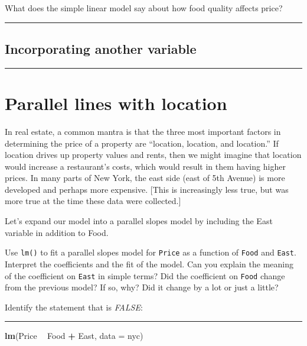 \documentclass[
]{book}
\newenvironment{Shaded}{\begin{snugshade}}{\end{snugshade}}
\newcommand{\DataTypeTok}[1]{\textcolor[rgb]{0.13,0.29,0.53}{#1}}
\newcommand{\KeywordTok}[1]{\textcolor[rgb]{0.13,0.29,0.53}{\textbf{#1}}}
\newcommand{\NormalTok}[1]{#1}
\newcommand{\OperatorTok}[1]{\textcolor[rgb]{0.81,0.36,0.00}{\textbf{#1}}}
\newcommand{\StringTok}[1]{\textcolor[rgb]{0.31,0.60,0.02}{#1}}
\begin{document}
What does the simple linear model say about how food quality affects price?

\begin{center}\rule{0.5\linewidth}{0.5pt}\end{center}

\hypertarget{incorporating-another-variable}{%
\subsection*{Incorporating another variable}\label{incorporating-another-variable}}

\begin{center}\rule{0.5\linewidth}{0.5pt}\end{center}

\hypertarget{parallel-lines-with-location}{%
\section{Parallel lines with location}\label{parallel-lines-with-location}}

In real estate, a common mantra is that the three most important factors in determining the price of a property are ``location, location, and location.'' If location drives up property values and rents, then we might imagine that location would increase a restaurant's costs, which would result in them having higher prices. In many parts of New York, the east side (east of 5th Avenue) is more developed and perhaps more expensive. {[}This is increasingly less true, but was more true at the time these data were collected.{]}

Let's expand our model into a parallel slopes model by including the East variable in addition to Food.

Use \texttt{lm()} to fit a parallel slopes model for \texttt{Price} as a function of \texttt{Food} and \texttt{East}. Interpret the coefficients and the fit of the model. Can you explain the meaning of the coefficient on \texttt{East} in simple terms? Did the coefficient on \texttt{Food} change from the previous model? If so, why? Did it change by a lot or just a little?

Identify the statement that is \emph{FALSE}:

\begin{center}\rule{0.5\linewidth}{0.5pt}\end{center}

\begin{Shaded}
\begin{Highlighting}[]
\KeywordTok{lm}\NormalTok{(Price }\OperatorTok{~}\StringTok{ }\NormalTok{Food }\OperatorTok{+}\StringTok{ }\NormalTok{East, }\DataTypeTok{data =}\NormalTok{ nyc)}
\end{Highlighting}
\end{Shaded}
\end{document}
